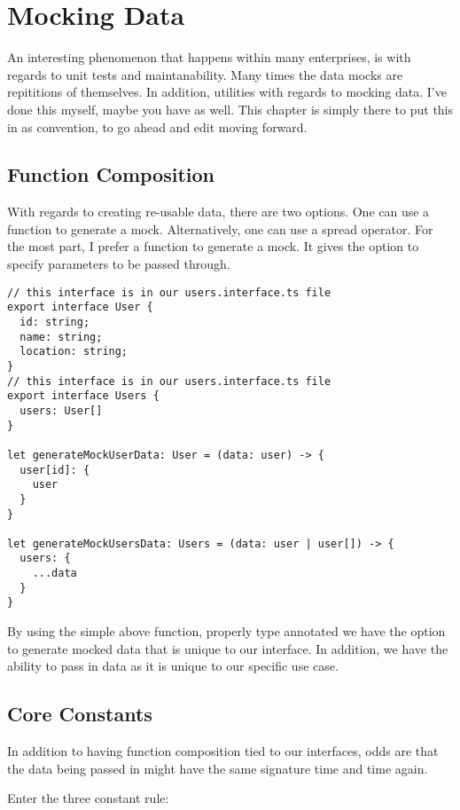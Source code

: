\maketitle{}
\section{ Mocking Data }
An interesting phenomenon that happens within many enterprises, is with regards
to unit tests and maintanability. Many times the data mocks are repititions of
themselves. In addition, utilities with regards to mocking data. I've done this
myself, maybe you have as well. This chapter is simply there to put this in as
convention, to go ahead and edit moving forward.

\subsection{ Function Composition }
With regards to creating re-usable data, there are two options. One can use a
function to generate a mock. Alternatively, one can use a spread operator. For
the most part, I prefer a function to generate a mock. It gives the option to
specify parameters to be passed through.

\begin{lstlisting}
// this interface is in our users.interface.ts file
export interface User {
  id: string;
  name: string;
  location: string;
}
// this interface is in our users.interface.ts file
export interface Users {
  users: User[]
}

let generateMockUserData: User = (data: user) -> {
  user[id]: {
    user
  }
}

let generateMockUsersData: Users = (data: user | user[]) -> {
  users: {
    ...data
  }
}
\end{lstlisting}

By using the simple above function, properly type annotated we have the option
to generate mocked data that is unique to our interface. In addition, we have
the ability to pass in data as it is unique to our specific use case.

\subsection{ Core Constants }
In addition to having function composition tied to our interfaces, odds are that
the data being passed in might have the same signature time and time again.

Enter the three constant rule:

